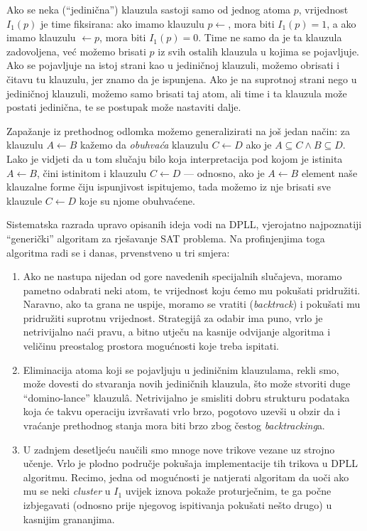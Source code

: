 Ako se neka (\enquote{jedinična}) klauzula sastoji samo od jednog atoma $p$, vrijednost $I_1(p)$ je time fiksirana: ako imamo klauzulu $p\leftarrow$, mora biti $I_1(p)=1$, a ako imamo klauzulu $\leftarrow p$, mora biti $I_1(p)=0$. Time ne samo da je ta klauzula zadovoljena, već možemo brisati $p$ iz svih ostalih klauzula u kojima se pojavljuje. Ako se pojavljuje na istoj strani kao u jediničnoj klauzuli, možemo obrisati i čitavu tu klauzulu, jer znamo da je ispunjena. Ako je na suprotnoj strani nego u jediničnoj klauzuli, možemo samo brisati taj atom, ali time i ta klauzula može postati jedinična, te se postupak može nastaviti dalje.

Zapažanje iz prethodnog odlomka možemo generalizirati na još jedan način: za klauzulu $A\leftarrow B$ kažemo da \emph{obuhvaća} klauzulu $C\leftarrow D$ ako je $A\subseteq C\land B\subseteq D$. Lako je vidjeti da u tom slučaju bilo koja interpretacija pod kojom je istinita $A\leftarrow B$, čini istinitom i klauzulu $C\leftarrow D$ --- odnosno, ako je $A\leftarrow B$ element naše klauzalne forme čiju ispunjivost ispitujemo, tada možemo iz nje brisati sve klauzule $C\leftarrow D$ koje su njome obuhvaćene.

Sistematska razrada upravo opisanih ideja vodi na DPLL, vjerojatno najpoznatiji \enquote{generički} algoritam za rješavanje SAT problema. Na profinjenjima toga algoritma radi se i danas, prvenstveno u tri smjera:
\begin{enumerate}
	\item Ako ne nastupa nijedan od gore navedenih specijalnih slučajeva, moramo pametno odabrati neki atom, te vrijednost koju ćemo mu pokušati pridružiti. Naravno, ako ta grana ne uspije, moramo se vratiti (\emph{backtrack}) i pokušati mu pridružiti suprotnu vrijednost. Strategijâ za odabir ima puno, vrlo je netrivijalno naći pravu, a bitno utječu na kasnije odvijanje algoritma i veličinu preostalog prostora mogućnosti koje treba ispitati.
	\item Eliminacija atoma koji se pojavljuju u jediničnim klauzulama, rekli smo, može dovesti do stvaranja novih jediničnih klauzula, što može stvoriti duge \enquote{domino-lance} klauzulâ. Netrivijalno je smisliti dobru strukturu podataka koja će takvu operaciju izvršavati vrlo brzo, pogotovo uzevši u obzir da i vraćanje prethodnog stanja mora biti brzo zbog čestog \emph{backtracking}a.
	\item U zadnjem desetljeću naučili smo mnoge nove trikove vezane uz strojno učenje. Vrlo je plodno područje pokušaja implementacije tih trikova u DPLL algoritmu. Recimo, jedna od mogućnosti je natjerati algoritam da uoči ako mu se neki \emph{cluster} u $I_1$ uvijek iznova pokaže proturječnim, te ga počne izbjegavati (odnosno prije njegovog ispitivanja pokušati nešto drugo) u kasnijim grananjima.
\end{enumerate}

